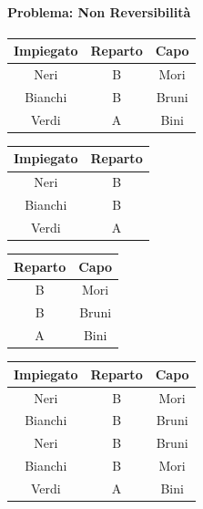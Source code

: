 \documentclass[../main.tex]{subfiles}
\begin{document}
	\paragraph{Problema: Non Reversibilità}
	\begin{center}
		\begin{tabular}{ |c|c|c| }
			\hline
			\textbf{Impiegato} & \textbf{Reparto} & \textbf{Capo}\\
			\hline
			Neri & B & Mori\\
			Bianchi & B & Bruni\\
			Verdi & A & Bini\\
			\hline
		\end{tabular}
	\end{center}
	\begin{center}
		\begin{tabular}{ |c|c| }
			\hline
			\textbf{Impiegato} & \textbf{Reparto}\\
			\hline
			Neri & B\\
			Bianchi & B\\
			Verdi & A\\
			\hline
		\end{tabular}
		\begin{tabular}{ |c|c| }
			\hline
			\textbf{Reparto} & \textbf{Capo}\\
			\hline
			B & Mori \\
			B & Bruni\\
			A & Bini\\
			\hline
		\end{tabular}
	\end{center}
	\begin{center}
		\begin{tabular}{ |c|c|c| }
			\hline
			\textbf{Impiegato} & \textbf{Reparto} & \textbf{Capo}\\
			\hline
			Neri & B & Mori\\
			Bianchi & B & Bruni\\
			Neri & B & Bruni\\
			Bianchi & B & Mori\\
			Verdi & A & Bini\\
			\hline
		\end{tabular}
	\end{center}
\end{document}
